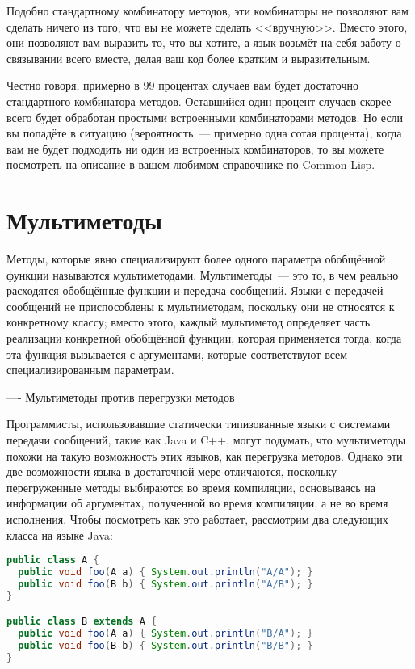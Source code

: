 Подобно стандартному комбинатору методов, эти комбинаторы не позволяют вам сделать ничего
из того, что вы не можете сделать <<вручную>>.  Вместо этого, они позволяют вам выразить то,
что вы хотите, а язык возьмёт на себя заботу о связывании всего вместе, делая ваш код
более кратким и выразительным.

Честно говоря, примерно в 99 процентах случаев вам будет достаточно стандартного
комбинатора методов.  Оставшийся один процент случаев скорее всего будет обработан
простыми встроенными комбинаторами методов.  Но если вы попадёте в ситуацию
(вероятность~--- примерно одна сотая процента), когда вам не будет подходить ни один из
встроенных комбинаторов, то вы можете посмотреть на описание
 в вашем любимом справочнике по Common Lisp.

\section{Мультиметоды}

Методы, которые явно специализируют более одного параметра обобщённой функции называются
мультиметодами. Мультиметоды~--- это то, в чем реально расходятся обобщённые функции и
передача сообщений.  Языки с передачей сообщений не приспособлены к мультиметодам,
поскольку они не относятся к конкретному классу; вместо этого, каждый мультиметод
определяет часть реализации конкретной обобщённой функции, которая применяется тогда,
когда эта функция вызывается с аргументами, которые соответствуют всем специализированным
параметрам.

----
Мультиметоды против перегрузки методов

Программисты, использовавшие статически типизованные языки с системами передачи сообщений,
такие как Java и C++, могут подумать, что мультиметоды похожи на такую возможность этих
языков, как перегрузка методов.  Однако эти две возможности языка в достаточной мере
отличаются, поскольку перегруженные методы выбираются во время компиляции, основываясь на
информации об аргументах, полученной во время компиляции, а не во время исполнения.  Чтобы
посмотреть как это работает, рассмотрим два следующих класса на языке Java:

\begin{lstlisting}[language=java]
public class A {
  public void foo(A a) { System.out.println("A/A"); }
  public void foo(B b) { System.out.println("A/B"); }
}

public class B extends A {
  public void foo(A a) { System.out.println("B/A"); }
  public void foo(B b) { System.out.println("B/B"); }
}
\end{lstlisting}

